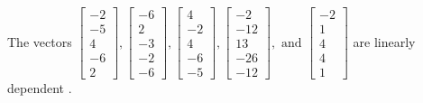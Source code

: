 \begin{exercise}
\begin{exerciseStatement}
  \end{exerciseStatement}
  \begin{exerciseAnswer}
   The vectors \(\left[\begin{array}{r}
-2 \\
-5 \\
4 \\
-6 \\
2
\end{array}\right] , \left[\begin{array}{r}
-6 \\
2 \\
-3 \\
-2 \\
-6
\end{array}\right] , \left[\begin{array}{r}
4 \\
-2 \\
4 \\
-6 \\
-5
\end{array}\right] , \left[\begin{array}{r}
-2 \\
-12 \\
13 \\
-26 \\
-12
\end{array}\right] , \text{ and } \left[\begin{array}{r}
-2 \\
1 \\
4 \\
4 \\
1
\end{array}\right]\) are 
  	 linearly dependent  .
  


  \end{exerciseAnswer}
\end{exercise}